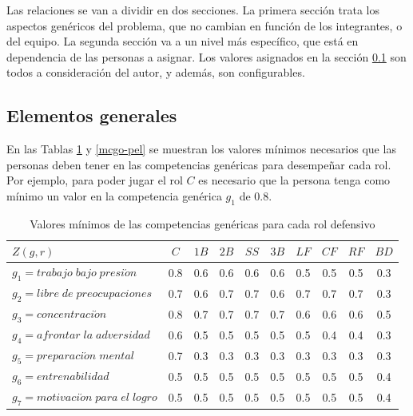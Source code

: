 Las relaciones se van a dividir en dos secciones. La primera sección trata los aspectos genéricos del problema, que no cambian en función de los integrantes, o del equipo. La segunda sección va a un nivel más específico, que está en dependencia de las personas a asignar. Los valores asignados en la sección \ref{asp-gen-pel} son todos a consideración del autor, y además, son configurables.

\subsection{Elementos generales} \label{asp-gen-pel}

En las Tablas \ref{mcgd-pel} y \ref{mcgo-pel} se muestran los valores mínimos necesarios que las personas deben tener en las competencias genéricas para desempeñar cada rol. Por ejemplo, para poder jugar el rol $C$ es necesario que la persona tenga como mínimo un valor en la competencia genérica $g_1$ de 0.8. 

 
\begin{table}[H]
	\caption{Valores mínimos de las competencias genéricas para cada rol defensivo}\label{mcgd-pel}
	\centering
	\begin{tabular}{|l|c|c|c|c|c|c|c|c|c|}
		\hline
		$Z(g,r)$ & $C$ & $1B$  & $2B$ & $SS$ & $3B$ & $LF$ & $CF$ & $RF$ & $BD$ \\ \hline
		$g_1=trabajo\;bajo\;presi\acute{o}n$ & 0.8 & 0.6 & 0.6 & 0.6 & 0.6 & 0.5 & 0.5 & 0.5 & 0.3
		\\ \hline
		$g_2=libre\;de\;preocupaciones$ & 0.7 & 0.6 & 0.7 & 0.7 & 0.6 & 0.7 & 0.7 & 0.7 & 0.3\\ \hline
		$g_3=concentraci\acute{o}n$ & 0.8 & 0.7 & 0.7 & 0.7 & 0.7 & 0.6 & 0.6 & 0.6 & 0.5 \\ \hline
		$g_4=afrontar\;la\;adversidad$ & 0.6 & 0.5 & 0.5 & 0.5 & 0.5 & 0.5 & 0.4 & 0.4 & 0.3 \\ \hline
		$g_5=preparaci\acute{o}n\;mental$ & 0.7 & 0.3 & 0.3 & 0.3 & 0.3 & 0.3 & 0.3 & 0.3 & 0.3 \\ \hline
		$g_6=entrenabilidad$ & 0.5 & 0.5 & 0.5 & 0.5 & 0.5 & 0.5 & 0.5 & 0.5 & 0.4\\ \hline
		$g_7=motivaci\acute{o}n\;para\;el\;logro$ & 0.5 & 0.5 & 0.5 & 0.5 & 0.5 & 0.5 & 0.5 & 0.5 & 0.4\\ \hline
	\end{tabular}
\end{table}

